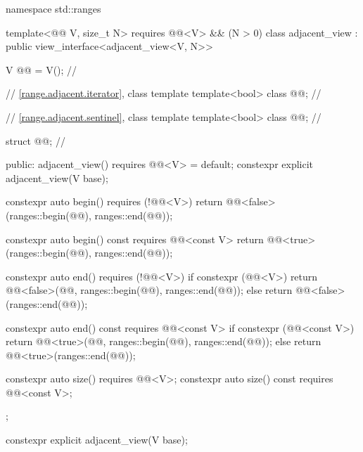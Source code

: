 \begin{codeblock}
namespace std::ranges {
  template<@@ V, size_t N>
    requires @@<V> && (N > 0)
  class adjacent_view : public view_interface<adjacent_view<V, N>> {
    V @@ = V();                      // \expos

    // \ref{range.adjacent.iterator}, class template 
    template<bool> class @@;      // \expos

    // \ref{range.adjacent.sentinel}, class template 
    template<bool> class @@;      // \expos

    struct @@{};               // \expos

  public:
    adjacent_view() requires @@<V> = default;
    constexpr explicit adjacent_view(V base);

    constexpr auto begin() requires (!@@<V>) {
      return @@<false>(ranges::begin(@@), ranges::end(@@));
    }

    constexpr auto begin() const requires @@<const V> {
      return @@<true>(ranges::begin(@@), ranges::end(@@));
    }

    constexpr auto end() requires (!@@<V>) {
      if constexpr (@@<V>) {
        return @@<false>(@@{}, ranges::begin(@@), ranges::end(@@));
      } else {
        return @@<false>(ranges::end(@@));
      }
    }

    constexpr auto end() const requires @@<const V> {
      if constexpr (@@<const V>) {
        return @@<true>(@@{}, ranges::begin(@@), ranges::end(@@));
      } else {
        return @@<true>(ranges::end(@@));
      }
    }

    constexpr auto size() requires @@<V>;
    constexpr auto size() const requires @@<const V>;
  };
}
\end{codeblock}

\begin{itemdecl}
constexpr explicit adjacent_view(V base);
\end{itemdecl}

